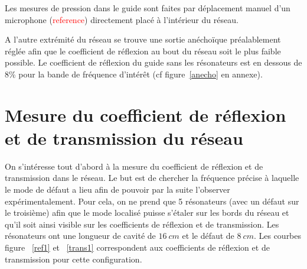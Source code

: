 Les mesures de pression dans le guide sont faites par déplacement manuel d'un microphone (\textcolor{red}{reference}) directement placé à l'intérieur du réseau.




\bigskip

A l'autre extrémité du réseau se trouve une sortie anéchoïque préalablement réglée afin que le coefficient de réflexion au bout du réseau soit le plus faible possible. Le coefficient de réflexion du guide sans les résonateurs est en dessous de 8\% pour la bande de fréquence d'intérêt (cf figure~\ref{anecho} en annexe).


\section{Mesure du coefficient de réflexion et de transmission du réseau}
On s'intéresse tout d'abord à la mesure du coefficient de réflexion et de transmission dans le réseau. Le but est de chercher la fréquence précise à laquelle le mode de défaut a lieu afin de pouvoir par la suite l'observer expérimentalement. Pour cela, on ne prend que 5 résonateurs (avec un défaut sur le troisième) afin que le mode localisé puisse s'étaler sur les bords du réseau et qu'il soit ainsi visible sur les coefficients de réflexion et de transmission. Les résonateurs ont une longueur de cavité de $16~cm$ et le défaut de $8~cm$. Les courbes figure ~\ref{ref1} et ~\ref{trans1} correspondent aux coefficients de réflexion et de transmission pour cette configuration.

